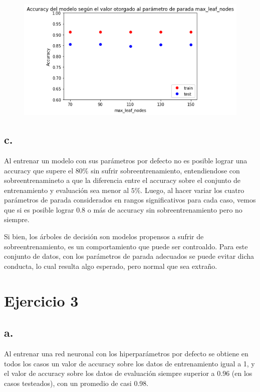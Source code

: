 \documentclass{article}
\begin{document}
\begin{center}
\begin{figure}[H]
	\centering
	\includegraphics*[scale=0.5]{Images/max_leaf_nodes.png}
\end{figure}
\end{center}

\subsection*{c.}

Al entrenar un modelo con sus parámetros por defecto no es posible lograr una accuracy que supere el $80\%$ sin sufrir sobreentrenamiento, entendiendose con sobreentrenamineto a que la diferencia entre el accuracy sobre el conjunto de entrenamiento y evaluación sea menor al $5\%$. Luego, al hacer variar los cuatro parámetros de parada considerados en rangos significativos para cada caso, vemos que si es posible lograr 0.8 o más de accuracy sin sobreentrenamiento pero no siempre.                  

Si bien, los árboles de decisión son modelos propensos a sufrir de sobreentrenamiento, es un comportamiento que puede ser controaldo. Para este conjunto de datos, con los parámetros de parada adecuados se puede evitar dicha conducta, lo cual resulta algo esperado, pero normal que sea extraño.

\section*{Ejercicio 3}

\subsection*{a.}

Al entrenar una red neuronal con los hiperparámetros por defecto se obtiene en todos los casos un valor de accuracy sobre los datos de entrenamiento igual a 1, y el valor de accuracy sobre los datos de evaluación siempre superior a 0.96 (en los casos testeados), con un promedio de casi 0.98. 
\end{document}
